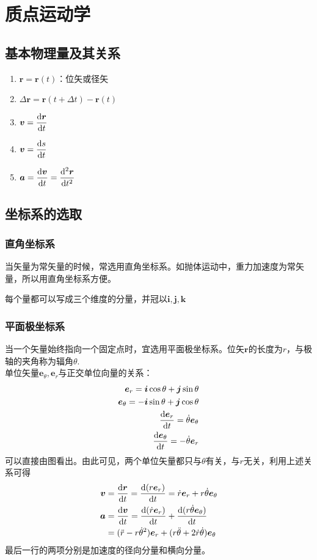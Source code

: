 \section{质点运动学}
\subsection{基本物理量及其关系}
\begin{enumerate}
	\item $\bm{r}=\bm{r}(t)$：位矢或径矢
	\item $\Delta \bm{r}=\bm{r}(t+\Delta t)-\bm{r}(t)$
	\item $\bm{v}=\dfrac{\mathrm{d} \bm{r}}{\mathrm{d} t}$
	\item $\bm{v}=\dfrac{\mathrm{d} s}{\mathrm{d} t}$
	\item $\bm{a}=\dfrac{\mathrm{d} \bm{v}}{\mathrm{d} t}=\dfrac{\mathrm{d}^2 \bm{r}}{\mathrm{d} t^2} $
\end{enumerate}
\subsection{坐标系的选取}
\subsubsection{直角坐标系}
当矢量为常矢量的时候，常选用直角坐标系。如抛体运动中，重力加速度为常矢量，所以用直角坐标系方便。

每个量都可以写成三个维度的分量，并冠以$\bm{i},\bm{j},\bm{k}$
\subsubsection{平面极坐标系}
当一个矢量始终指向一个固定点时，宜选用平面极坐标系。位矢$\bm{r}$的长度为$r$，与极轴的夹角称为辐角$\theta$.\\
单位矢量$\bm{e}_\theta,\bm{e}_r$与正交单位向量的关系：
\begin{align}\label{key}
	\bm{e}_r=\bm{i}\cos \theta+\bm{j}\sin \theta\\
	\bm{e}_\theta=-\bm{i}\sin \theta+\bm{j}\cos \theta\\
	\dfrac{\mathrm{d} \bm{e}_r}{\mathrm{d} t}=\dot{\theta}\bm{e}_\theta\\
	\dfrac{\mathrm{d} \bm{e}_\theta}{\mathrm{d} t}=-\dot{\theta}\bm{e}_r
\end{align}
可以直接由图看出。由此可见，两个单位矢量都只与$\theta$有关，与$r$无关，利用上述关系可得
\begin{align}
	\bm{v}&=\dfrac{\mathrm{d} \bm{r}}{\mathrm{d} t}=\dfrac{\mathrm{d} (r\bm{e}_r)}{\mathrm{d} t}=\dot{r}\bm{e}_r+r\dot{\theta}\bm{e}_\theta\\
	\bm{a}&=\dfrac{\mathrm{d} \bm{v}}{\mathrm{d} t}=\dfrac{\mathrm{d} (\dot{r}\bm{e}_r)}{\mathrm{d} t}+\dfrac{\mathrm{d} (r\dot{\theta}\bm{e}_\theta)}{\mathrm{d} t}\\
	&=(\ddot{r}-r\dot{\theta}^2)\bm{e}_r+(r\ddot{\theta}+2\dot{r}\dot{\theta})\bm{e}_\theta
\end{align}
最后一行的两项分别是加速度的径向分量和横向分量。
